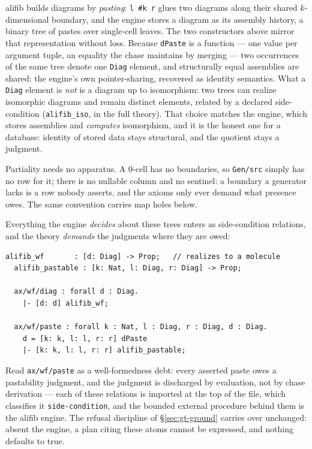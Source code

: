 alifib builds diagrams by \emph{pasting}: \texttt{l \#k r} glues two
diagrams along their shared $k$-dimensional boundary, and the engine
stores a diagram as its assembly history, a binary tree of pastes over
single-cell leaves. The two constructors above mirror that
representation without loss. Because \texttt{dPaste} is a function ---
one value per argument tuple, an equality the chase maintains by
merging --- two occurrences of the same tree denote one \texttt{Diag}
element, and structurally equal assemblies are shared: the engine's
own pointer-sharing, recovered as identity semantics. What a
\texttt{Diag} element is \emph{not} is a diagram up to isomorphism:
two trees can realize isomorphic diagrams and remain distinct
elements, related by a declared side-condition (\texttt{alifib\_iso},
in the full theory). That choice matches the engine, which stores
assemblies and \emph{computes} isomorphism, and it is the honest one
for a database: identity of stored data stays structural, and the
quotient stays a judgment.

Partiality needs no apparatus. A 0-cell has no boundaries, so
\texttt{Gen/src} simply has no row for it; there is no nullable column
and no sentinel: a boundary a generator lacks is a row nobody asserts,
and the axioms only ever demand what presence owes. The same
convention carries map holes below.

Everything the engine \emph{decides} about these trees enters as
side-condition relations, and the theory \emph{demands} the judgments
where they are owed:

\begin{Verbatim}[fontsize=\small,frame=leftline,rulecolor=\color{accentmid},framesep=3mm,xleftmargin=3mm]
  alifib_wf       : [d: Diag] -> Prop;   // realizes to a molecule
  alifib_pastable : [k: Nat, l: Diag, r: Diag] -> Prop;

  ax/wf/diag : forall d : Diag.
    |- [d: d] alifib_wf;

  ax/wf/paste : forall k : Nat, l : Diag, r : Diag, d : Diag.
    d = [k: k, l: l, r: r] dPaste
    |- [k: k, l: l, r: r] alifib_pastable;
\end{Verbatim}

\noindent Read \texttt{ax/wf/paste} as a well-formedness debt: every
asserted paste owes a pastability judgment, and the judgment is
discharged by evaluation, not by chase derivation --- each of these
relations is imported at the top of the file, which classifies it
\texttt{side-condition}, and the bounded external procedure behind
them is the alifib engine. The
refusal discipline of \S\ref{sec:gt-ground} carries over unchanged:
absent the engine, a plan citing these atoms cannot be expressed,
and nothing defaults to true.

